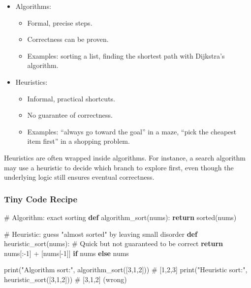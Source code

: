 \documentclass[
  letterpaper,
  DIV=11,
  numbers=noendperiod]{scrreprt}
\newenvironment{Shaded}{\begin{snugshade}}{\end{snugshade}}
\newcommand{\BuiltInTok}[1]{\textcolor[rgb]{0.00,0.23,0.31}{#1}}
\newcommand{\CommentTok}[1]{\textcolor[rgb]{0.37,0.37,0.37}{#1}}
\newcommand{\ControlFlowTok}[1]{\textcolor[rgb]{0.00,0.23,0.31}{\textbf{#1}}}
\newcommand{\DecValTok}[1]{\textcolor[rgb]{0.68,0.00,0.00}{#1}}
\newcommand{\KeywordTok}[1]{\textcolor[rgb]{0.00,0.23,0.31}{\textbf{#1}}}
\newcommand{\NormalTok}[1]{\textcolor[rgb]{0.00,0.23,0.31}{#1}}
\newcommand{\OperatorTok}[1]{\textcolor[rgb]{0.37,0.37,0.37}{#1}}
\newcommand{\StringTok}[1]{\textcolor[rgb]{0.13,0.47,0.30}{#1}}
\providecommand{\tightlist}{%
  \setlength{\itemsep}{0pt}\setlength{\parskip}{0pt}}
\begin{document}
\begin{itemize}
\item
  Algorithms:

  \begin{itemize}
  \tightlist
  \item
    Formal, precise steps.
  \item
    Correctness can be proven.
  \item
    Examples: sorting a list, finding the shortest path with Dijkstra's
    algorithm.
  \end{itemize}
\item
  Heuristics:

  \begin{itemize}
  \tightlist
  \item
    Informal, practical shortcuts.
  \item
    No guarantee of correctness.
  \item
    Examples: ``always go toward the goal'' in a maze, ``pick the
    cheapest item first'' in a shopping problem.
  \end{itemize}
\end{itemize}

Heuristics are often wrapped inside algorithms. For instance, a search
algorithm may use a heuristic to decide which branch to explore first,
even though the underlying logic still ensures eventual correctness.

\subsubsection{Tiny Code Recipe}\label{tiny-code-recipe-83}

\begin{Shaded}
\begin{Highlighting}[]
\CommentTok{\# Algorithm: exact sorting}
\KeywordTok{def}\NormalTok{ algorithm\_sort(nums):}
    \ControlFlowTok{return} \BuiltInTok{sorted}\NormalTok{(nums)}

\CommentTok{\# Heuristic: guess "almost sorted" by leaving small disorder}
\KeywordTok{def}\NormalTok{ heuristic\_sort(nums):}
    \CommentTok{\# Quick but not guaranteed to be correct}
    \ControlFlowTok{return}\NormalTok{ nums[:}\OperatorTok{{-}}\DecValTok{1}\NormalTok{] }\OperatorTok{+}\NormalTok{ [nums[}\OperatorTok{{-}}\DecValTok{1}\NormalTok{]] }\ControlFlowTok{if}\NormalTok{ nums }\ControlFlowTok{else}\NormalTok{ nums}

\BuiltInTok{print}\NormalTok{(}\StringTok{"Algorithm sort:"}\NormalTok{, algorithm\_sort([}\DecValTok{3}\NormalTok{,}\DecValTok{1}\NormalTok{,}\DecValTok{2}\NormalTok{]))   }\CommentTok{\# [1,2,3]}
\BuiltInTok{print}\NormalTok{(}\StringTok{"Heuristic sort:"}\NormalTok{, heuristic\_sort([}\DecValTok{3}\NormalTok{,}\DecValTok{1}\NormalTok{,}\DecValTok{2}\NormalTok{]))   }\CommentTok{\# [3,1,2] (wrong)}
\end{Highlighting}
\end{Shaded}
\end{document}
